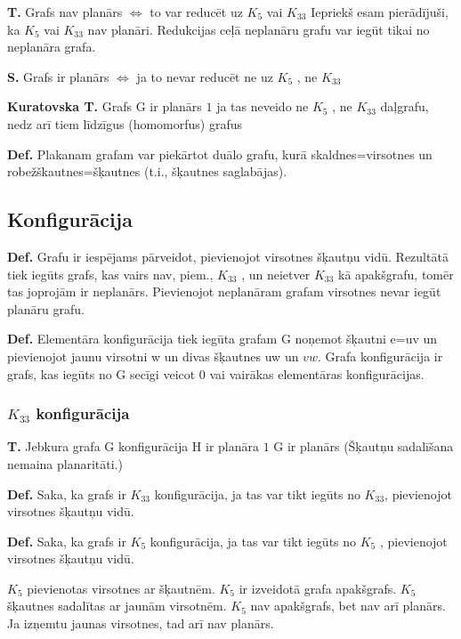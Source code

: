 \documentclass{article}
\begin{document}
\textbf{T.}  Grafs nav planārs $\Leftrightarrow$ to var reducēt uz $K_5$ vai $K_{33}$ Iepriekš esam pierādījuši, ka $K_5$ vai $K_{33}$ nav planāri.  Redukcijas ceļā neplanāru grafu var iegūt tikai no neplanāra grafa.

\textbf{S. } Grafs ir planārs $\Leftrightarrow$ ja to nevar reducēt ne uz $K_5$ , ne $K_{33}$

\textbf{Kuratovska T.} Grafs G ir planārs $1$ ja tas neveido ne $K_5$ , ne $K_{33}$ daļgrafu, nedz arī tiem līdzīgus (homomorfus) grafus

\textbf{Def.}  Plakanam grafam var piekārtot duālo grafu, kurā skaldnes=virsotnes un robežškautnes=šķautnes (t.i., šķautnes saglabājas).

\subsection{Konfigurācija}

\textbf{Def.} Grafu ir iespējams pārveidot, pievienojot virsotnes šķautņu vidū.  Rezultātā tiek iegūts grafs, kas vairs nav, piem., $K_{33}$ , un neietver $K_{33}$ kā apakšgrafu, tomēr tas joprojām ir neplanārs.  Pievienojot neplanāram grafam virsotnes nevar iegūt planāru grafu.

\textbf{Def.}  Elementāra konfigurācija tiek iegūta grafam G noņemot šķautni e=uv un pievienojot jaunu virsotni w un divas šķautnes uw un $vw$.  Grafa konfigurācija ir grafs, kas iegūts no G secīgi veicot 0 vai vairākas elementāras konfigurācijas.

\subsubsection{$K_{33}$ konfigurācija}

\textbf{T.}  Jebkura grafa G konfigurācija H ir planāra $1$ G ir planārs (Šķautņu sadalīšana nemaina planaritāti.)

\textbf{Def.}  Saka, ka grafs ir $K_{33}$ konfigurācija, ja tas var tikt iegūts no $K_{33}$, pievienojot virsotnes šķautņu vidū.

\textbf{Def.}  Saka, ka grafs ir $K_5$ konfigurācija, ja tas var tikt iegūts no $K_5$ , pievienojot virsotnes šķautņu vidū.

$K_5$ pievienotas virsotnes ar šķautnēm. $K_5$ ir izveidotā grafa apakšgrafs. $K_5$ šķautnes sadalītas ar jaunām virsotnēm. $K_5$ nav apakšgrafs, bet nav arī planārs. Ja izņemtu jaunas virsotnes, tad arī nav planārs.
\end{document}
